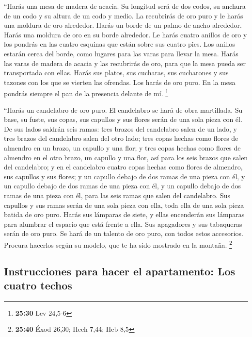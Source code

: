 ``Harás una mesa de madera de acacia. Su longitud será
de dos codos, su anchura de un codo y su altura de un codo y medio.
 La recubrirás de oro puro y le harás una moldura de oro
alrededor.  Harás un borde de un palmo de ancho
alrededor. Harás una moldura de oro en su borde alrededor.
 Le harás cuatro anillos de oro y los pondrás en las
cuatro esquinas que están sobre sus cuatro pies.  Los
anillos estarán cerca del borde, como lugares para las varas para llevar
la mesa.  Harás las varas de madera de acacia y las
recubrirás de oro, para que la mesa pueda ser transportada con ellas.
 Harás sus platos, sus cucharas, sus cucharones y sus
tazones con los que se vierten las ofrendas. Los harás de oro puro.
 En la mesa pondrás siempre el pan de la presencia
delante de mí. \footnote{\textbf{25:30} Lev 24,5-6}

 ``Harás un candelabro de oro puro. El candelabro se hará
de obra martillada. Su base, su fuste, sus copas, sus capullos y sus
flores serán de una sola pieza con él.  De sus lados
saldrán seis ramas: tres brazos del candelabro salen de un lado, y tres
brazos del candelabro salen del otro lado;  tres copas
hechas como flores de almendro en un brazo, un capullo y una flor; y
tres copas hechas como flores de almendro en el otro brazo, un capullo y
una flor, así para los seis brazos que salen del candelabro;
 y en el candelabro cuatro copas hechas como flores de
almendro, sus capullos y sus flores;  y un capullo debajo
de dos ramas de una pieza con él, y un capullo debajo de dos ramas de
una pieza con él, y un capullo debajo de dos ramas de una pieza con él,
para las seis ramas que salen del candelabro.  Sus
capullos y sus ramas serán de una sola pieza con ella, toda ella de una
sola pieza batida de oro puro.  Harás sus lámparas de
siete, y ellas encenderán sus lámparas para alumbrar el espacio que está
frente a ella.  Sus apagadores y sus tabaqueras serán de
oro puro.  Se hará de un talento de oro puro, con todos
estos accesorios.  Procura hacerlos según su modelo, que
te ha sido mostrado en la montaña. \footnote{\textbf{25:40} Éxod 26,30;
  Hech 7,44; Heb 8,5}

\hypertarget{instrucciones-para-hacer-el-apartamento-los-cuatro-techos}{%
\subsection{Instrucciones para hacer el apartamento: Los cuatro
techos}\label{instrucciones-para-hacer-el-apartamento-los-cuatro-techos}}

